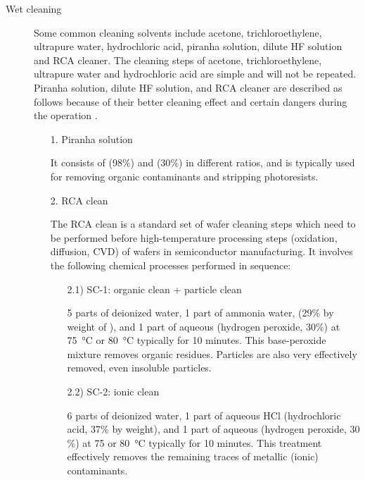 \begin{description}
	
\item [Wet cleaning] Some  common cleaning solvents include acetone, trichloroethylene, ultrapure water, hydrochloric  acid, piranha solution, dilute HF  solution and RCA cleaner. The cleaning steps of acetone, trichloroethylene, ultrapure water and hydrochloric acid are simple and will not be repeated. Piranha solution, dilute HF solution, and RCA cleaner are described as follows because of their better cleaning effect and certain dangers during the operation \cite{reinhardt2018handbook,king1998cleaning,tsujiwet}.

\begin{itemize}
\item[1.] Piranha solution

It consists of  (98$\%$) and  (30$\%$) in different ratios, and is typically used for removing organic contaminants  and  stripping photoresists.


\item[2.] RCA clean

The RCA clean  is a  standard set of wafer cleaning steps which need to be performed before high-temperature processing steps (oxidation, diffusion, CVD) of wafers in semiconductor manufacturing. It involves the following chemical processes performed in sequence:

\begin{itemize}
	\item[2.1)] SC-1: organic clean + particle clean
	
	5 parts of deionized  water, 1 part of ammonia water, (29$\%$ by weight of ), and 1 part of  aqueous  (hydrogen peroxide, 30$\%$) at \SI{75}{\degreeCelsius} or \SI{80}{\degreeCelsius} typically for 10 minutes. This base-peroxide mixture removes organic residues. Particles are also very effectively removed, even insoluble particles. 
    
    \item[2.2)] SC-2: ionic clean
	
	6 parts of deionized water, 1 part of aqueous  HCl (hydrochloric acid, 37$\%$ by weight), and 1 part of aqueous  (hydrogen peroxide, 30$\%$)
at 75 or \SI{80}{\degreeCelsius} typically for 10 minutes. This treatment effectively removes the remaining traces of metallic (ionic) contaminants.
\end{itemize}


\end{itemize}
\end{description}
